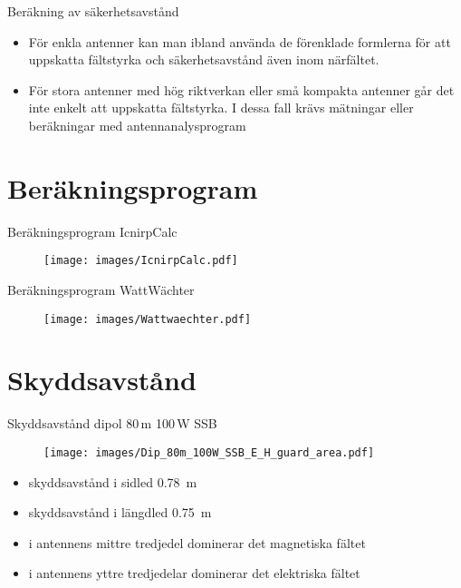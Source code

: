 \documentclass{beamer}
\begin{document}
\begin{frame}{Beräkning av säkerhetsavstånd}
\begin{itemize}
	\item För enkla antenner kan man ibland använda de förenklade formlerna för
	att uppskatta fältstyrka och säkerhetsavstånd även inom närfältet.
	\item För stora antenner med hög riktverkan eller små kompakta antenner går
	det inte enkelt att uppskatta fältstyrka. I dessa fall krävs mätningar eller
	beräkningar med antennanalysprogram
\end{itemize}
\end{frame}


\section{Beräkningsprogram}

\begin{frame}{Beräkningsprogram IcnirpCalc}

\begin{figure}[h]
	\texttt{[image: images/IcnirpCalc.pdf]}
\end{figure}

\end{frame}

\begin{frame}{Beräkningsprogram WattWächter}

\begin{figure}[h]
	\texttt{[image: images/Wattwaechter.pdf]}
\end{figure}

\end{frame}

\section{Skyddsavstånd}

\begin{frame}{Skyddsavstånd dipol 80\,m 100\,W SSB}

\begin{figure}[h]
\texttt{[image: images/Dip\_80m\_100W\_SSB\_E\_H\_guard\_area.pdf]}
\end{figure}

\begin{itemize}
  \item skyddsavstånd i sidled \qty{0,78}{\meter}
  \item skyddsavstånd i längdled \qty{0,75}{\meter}
  \item i antennens mittre tredjedel dominerar det magnetiska fältet
  \item i antennens yttre tredjedelar dominerar det elektriska fältet
\end{itemize}
\end{frame}
\end{document}
